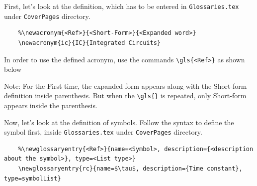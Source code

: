 First, let's look at the definition, which has to be entered in \texttt{Glossaries.tex} under \texttt{CoverPages} directory.
\begin{verbatim}
	%\newacronym{<Ref>}{<Short-Form>}{<Expanded word>}
	\newacronym{ic}{IC}{Integrated Circuits}
\end{verbatim}
In order to use the defined acronym, use the commands \verb|\gls{<Ref>}| as shown below


Note: For the First time, the expanded form appears along with the Short-form definition inside parenthesis. But when the \verb|\gls{}| is repeated, only Short-form appears inside the parenthesis.

Now, let's look at the definition of symbols. Follow the syntax to define the symbol first, inside \texttt{Glossaries.tex} under \texttt{CoverPages} directory.
\begin{verbatim}
	%\newglossaryentry{<Ref>}{name=<Symbol>, description={<description about the symbol>}, type=<List type>}
	\newglossaryentry{rc}{name=$\tau$, description={Time constant}, type=symbolList}
\end{verbatim}

